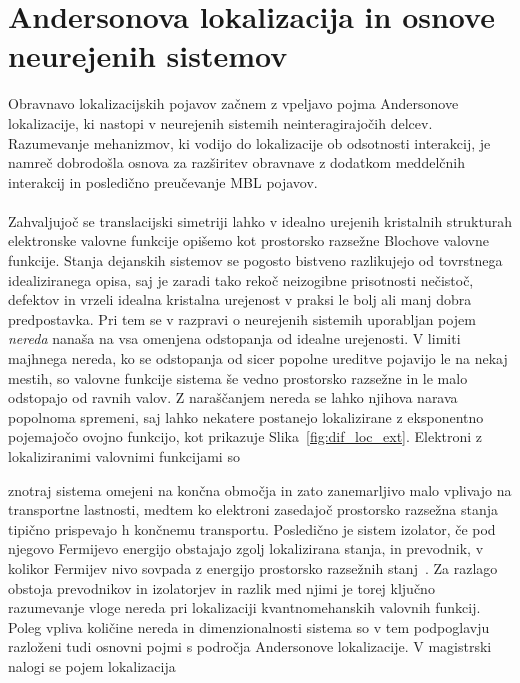 \section{Andersonova lokalizacija in osnove neurejenih sistemov}
\label{anderson}
Obravnavo lokalizacijskih pojavov začnem z vpeljavo pojma Andersonove lokalizacije, ki nastopi v neurejenih sistemih neinteragirajočih delcev. Razumevanje mehanizmov, ki vodijo do lokalizacije ob odsotnosti interakcij, je namreč dobrodošla osnova za razširitev obravnave z dodatkom meddelčnih interakcij in posledično preučevanje MBL pojavov. \\\\	
Zahvaljujoč se translacijski simetriji lahko v idealno urejenih kristalnih strukturah elektronske valovne funkcije  opišemo kot prostorsko razsežne Blochove valovne funkcije. Stanja dejanskih sistemov se pogosto bistveno razlikujejo od tovrstnega idealiziranega opisa, saj je zaradi tako rekoč neizogibne prisotnosti nečistoč, defektov in vrzeli idealna kristalna urejenost v praksi le bolj ali manj dobra predpostavka. Pri tem se v razpravi o neurejenih sistemih uporabljan pojem \emph{nereda} nanaša na vsa omenjena odstopanja od idealne urejenosti.  V limiti majhnega nereda, ko se odstopanja od sicer popolne ureditve pojavijo le na nekaj mestih, so valovne funkcije sistema še vedno prostorsko razsežne in le malo odstopajo od ravnih valov. Z naraščanjem nereda se lahko njihova narava popolnoma spremeni, saj lahko nekatere  postanejo lokalizirane z eksponentno pojemajočo ovojno funkcijo, kot prikazuje Slika~\ref{fig:dif_loc_ext}. Elektroni z lokaliziranimi valovnimi funkcijami so\\
\begin{minipage}[t]{0.54\textwidth}
\noindent 
    znotraj sistema omejeni na končna območja in zato zanemarljivo malo vplivajo na transportne lastnosti, medtem ko elektroni zasedajoč prostorsko razsežna stanja tipično prispevajo h končnemu transportu. Posledično je sistem izolator, če pod njegovo Fermijevo energijo obstajajo zgolj lokalizirana stanja, in prevodnik, v kolikor Fermijev nivo sovpada z energijo prostorsko razsežnih stanj~\cite{kramer1993localization}. Za razlago obstoja prevodnikov in izolatorjev in razlik med njimi je torej ključno razumevanje vloge nereda pri lokalizaciji kvantnomehanskih valovnih funkcij. Poleg vpliva količine nereda in dimenzionalnosti sistema so v tem podpoglavju razloženi tudi osnovni pojmi s področja Andersonove lokalizacije. V magistrski nalogi se pojem lokalizacija  
\end{minipage}\hfill
